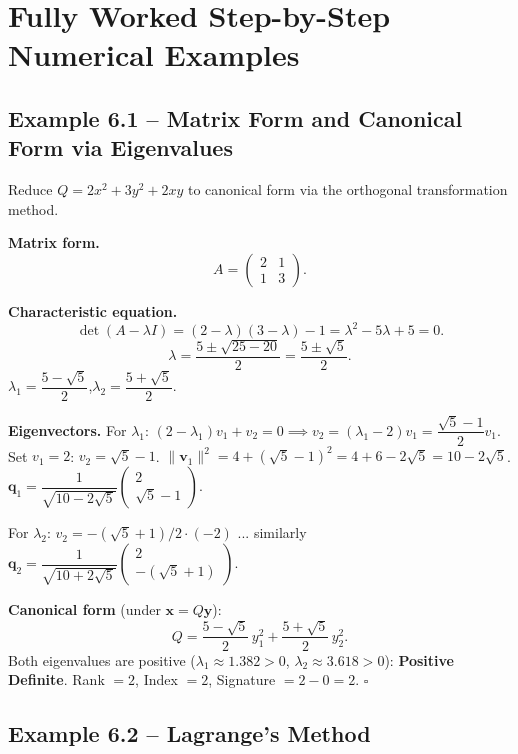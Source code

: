 \documentclass[12pt,a4paper]{article}
\begin{document}
\section{Fully Worked Step-by-Step Numerical Examples}

\subsection*{Example 6.1 -- Matrix Form and Canonical Form via Eigenvalues}

Reduce $Q = 2x^{2} + 3y^{2} + 2xy$ to canonical form via the orthogonal transformation method.

\textbf{Matrix form.}
\[
A = \begin{pmatrix} 2 & 1 \\ 1 & 3 \end{pmatrix}.
\]

\textbf{Characteristic equation.}
\[
\det(A - \lambda I)
= (2-\lambda)(3-\lambda)-1
= \lambda^{2} - 5\lambda + 5 = 0.
\]
\[
\lambda = \frac{5 \pm \sqrt{25-20}}{2} = \frac{5 \pm \sqrt{5}}{2}.
\]
$\lambda_1 = \dfrac{5-\sqrt{5}}{2}$,\quad $\lambda_2 = \dfrac{5+\sqrt{5}}{2}$.

\textbf{Eigenvectors.}
For $\lambda_1$: $(2 - \lambda_1)v_1 + v_2 = 0 \implies v_2 = (\lambda_1 - 2)v_1 = \dfrac{\sqrt{5}-1}{2}v_1$.
Set $v_1 = 2$: $v_2 = \sqrt{5}-1$.
$\|\mathbf{v}_1\|^{2} = 4 + (\sqrt{5}-1)^{2} = 4 + 6 - 2\sqrt{5} = 10 - 2\sqrt{5}$.
$\mathbf{q}_1 = \dfrac{1}{\sqrt{10-2\sqrt{5}}}\begin{pmatrix}2\\\sqrt{5}-1\end{pmatrix}$.

For $\lambda_2$: $v_2 = -(\sqrt{5}+1)/2 \cdot (-2)$ ... similarly $\mathbf{q}_2 = \dfrac{1}{\sqrt{10+2\sqrt{5}}}\begin{pmatrix}2\\-(\sqrt{5}+1)\end{pmatrix}$.

\textbf{Canonical form} (under $\mathbf{x} = Q\mathbf{y}$):
\[
\boxed{Q = \frac{5-\sqrt{5}}{2}\,y_1^{2} + \frac{5+\sqrt{5}}{2}\,y_2^{2}.}
\]
Both eigenvalues are positive ($\lambda_1 \approx 1.382 > 0$, $\lambda_2 \approx 3.618 > 0$): \textbf{Positive Definite}.
Rank $= 2$, Index $= 2$, Signature $= 2 - 0 = 2$. \hfill$\square$

\subsection*{Example 6.2 -- Lagrange's Method}
\end{document}
